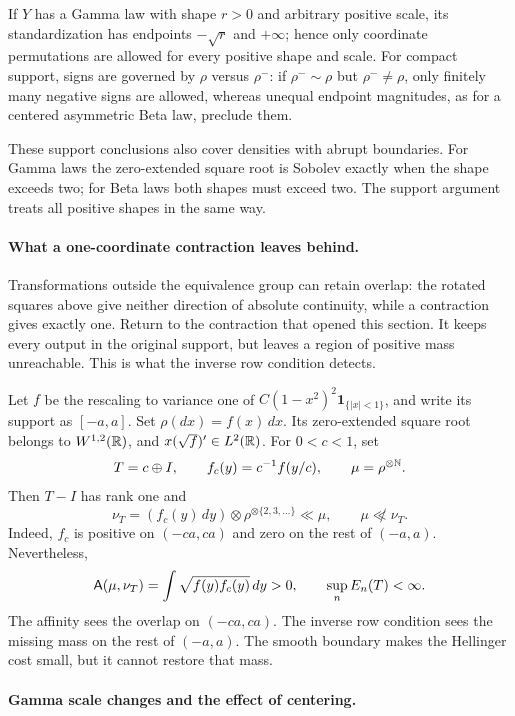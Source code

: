 If \(Y\) has a Gamma law with shape \(r>0\) and arbitrary positive scale,
its standardization has endpoints \(-\sqrt{r}\) and \(+\infty\); hence only coordinate
permutations are allowed for every positive shape and scale.  For compact
support, signs are governed by \(\rho\) versus \(\rho^-\): if
\(\rho^-\sim\rho\) but \(\rho^-\ne\rho\), only finitely many negative signs are
allowed, whereas unequal endpoint magnitudes, as for a centered asymmetric
Beta law, preclude them.

These support conclusions also cover densities with abrupt boundaries.
For Gamma laws the zero-extended square root is Sobolev exactly when the
shape exceeds two; for Beta laws both shapes must exceed two. The support
argument treats all positive shapes in the same way.

\paragraph{What a one-coordinate contraction leaves behind.}

Transformations outside the equivalence group can retain overlap: the
rotated squares above give neither direction of absolute continuity, while
a contraction gives exactly one. Return to the contraction that opened
this section. It keeps every output in the original support, but leaves
a region of positive mass unreachable. This is what the inverse row
condition detects.

Let \(f\) be the rescaling to variance one of
\(C(1-x^2)^2\mathbf 1_{\{|x|<1\}}\), and write its support as
\([-a,a]\).
Set \(\rho(dx)=f(x)\,dx\).
Its zero-extended square root belongs to \(W^{1,2}(\mathbb R)\), and
\(x(\sqrt f)'\in L^2(\mathbb R)\).
For \(0<c<1\), set
\[
 T=c\oplus I,\qquad
 f_c(y)=c^{-1}f(y/c),\qquad \mu=\rho^{\otimes\mathbb N}.
\]
Then \(T-I\) has rank one and
\[
 \nu_T=(f_c(y)\,dy)\otimes\rho^{\otimes\{2,3,\ldots\}}\ll\mu,
 \qquad \mu\not\ll\nu_T.
\]
Indeed, \(f_c\) is positive on \((-ca,ca)\) and zero on the rest
of \((-a,a)\).
Nevertheless,
\[
 \mathsf A(\mu,\nu_T)=\int\sqrt{f(y)f_c(y)}\,dy>0,
 \qquad \sup_n E_n(T)<\infty.
\]
The affinity sees the overlap on \((-ca,ca)\). The inverse row condition
sees the missing mass on the rest of \((-a,a)\). The smooth boundary makes
the Hellinger cost small, but it cannot restore that mass.

\paragraph{Gamma scale changes and the effect of centering.}

